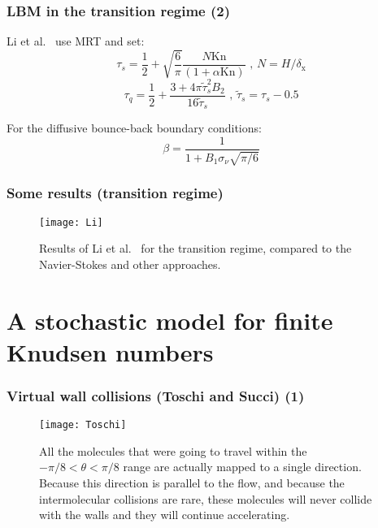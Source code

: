 \documentclass{beamer}
\begin{document}
\begin{frame}
 \frametitle{LBM in the transition regime (2)}
 Li et al.~\cite{Li2011} use MRT and set:
 \begin{equation}
 \tau_s = \frac{1}{2} + \sqrt{\frac{6}{\pi}} \frac{N \mathrm{Kn}}{(1+\alpha \mathrm{Kn})} \textrm{ , \ } N=H/\delta_\mathrm{x}
\end{equation}
\begin{equation}
 \tau_q = \frac{1}{2} + \frac{3 + 4 \pi \tilde{\tau}_s^2 B_2}{16 \tilde{\tau}_s } \textrm{ , \ } \tilde{\tau}_s = \tau_s - 0.5
\end{equation}

For the diffusive bounce-back boundary conditions:
\begin{equation}
 \beta = \frac{1}{1 + B_1 \sigma_\nu \sqrt{\pi / 6}}
\end{equation}
\end{frame}

\begin{frame}
 \frametitle{Some results (transition regime)}
 \begin{figure}
  \texttt{[image: Li]}
  \caption{Results of Li et al.~\cite{Li2011} for the transition regime, compared to the Navier-Stokes and other approaches.}
 \end{figure}
\end{frame}

\section{A stochastic model for finite Knudsen numbers}

\begin{frame}
 \frametitle{Virtual wall collisions (Toschi and Succi) (1)}
 \begin{figure}
  \texttt{[image: Toschi]}
  \caption{All the molecules that were going to travel within the %
 		$-\pi/8 < \theta < \pi/8$ range are actually mapped to %
 		a single direction. Because this direction is parallel to the flow, %
 		and because the intermolecular collisions are rare, these molecules %
 		will never collide with the walls and they will continue accelerating.}
 \end{figure}

\end{frame}
\end{document}
